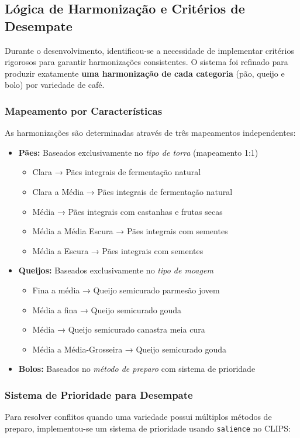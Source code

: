 \documentclass[a4paper,12pt]{article}
\begin{document}
\subsection{Lógica de Harmonização e Critérios de Desempate}
Durante o desenvolvimento, identificou-se a necessidade de implementar critérios rigorosos para garantir harmonizações consistentes. O sistema foi refinado para produzir exatamente \textbf{uma harmonização de cada categoria} (pão, queijo e bolo) por variedade de café.

\subsubsection{Mapeamento por Características}
As harmonizações são determinadas através de três mapeamentos independentes:
\begin{itemize}
  \item \textbf{Pães:} Baseados exclusivamente no \emph{tipo de torra} (mapeamento 1:1)
    \begin{itemize}
      \item Clara → Pães integrais de fermentação natural
      \item Clara a Média → Pães integrais de fermentação natural
      \item Média → Pães integrais com castanhas e frutas secas  
      \item Média a Média Escura → Pães integrais com sementes
      \item Média a Escura → Pães integrais com sementes
    \end{itemize}
  \item \textbf{Queijos:} Baseados exclusivamente no \emph{tipo de moagem}
    \begin{itemize}
      \item Fina a média → Queijo semicurado parmesão jovem
      \item Média a fina → Queijo semicurado gouda
      \item Média → Queijo semicurado canastra meia cura
      \item Média a Média-Grosseira → Queijo semicurado gouda
    \end{itemize}
  \item \textbf{Bolos:} Baseados no \emph{método de preparo} com sistema de prioridade
\end{itemize}

\subsubsection{Sistema de Prioridade para Desempate}
Para resolver conflitos quando uma variedade possui múltiplos métodos de preparo, implementou-se um sistema de prioridade usando \texttt{salience} no CLIPS:
\end{document}
